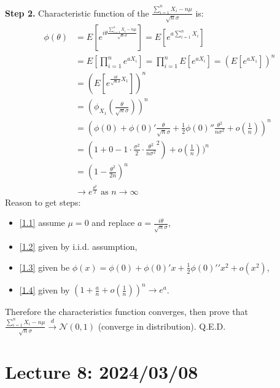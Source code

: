 \documentclass[11pt]{article}
\theoremstyle{definition}
\theoremstyle{remark}
\begin{document}
    \textbf{Step 2.} Characteristic function of the $\frac{\sum_{i=1}^{n} X_i -n\mu}{\sqrt{n}\sigma}$ is: 
    \begin{align}
        \phi(\theta) &= E[e^{i\theta \frac{\sum_{i=1}^{n} X_i -n\mu}{\sqrt{n}\sigma}}] = E[e^{a\sum_{i=1}^{n} X_i}] \label{1.1}\\
        &= E[\prod_{i=1}^n e^{aX_i}] = \prod_{i=1}^n E[ e^{aX_i}]  = (E[e^{a X_1}])^n\label{1.2}\\
        &=(E[e^{\frac{i\theta}{\sqrt{n}\sigma} X_1}])^n \\
        &= (\phi_{X_1}(\frac{\theta}{\sqrt{n}\sigma}))^n \\
        &= (\phi(0) + \phi(0)' \frac{\theta}{\sqrt{n}\sigma} + \frac{1}{2} \phi(0)'' \frac{\theta^2}{n\sigma^2} + o(\frac{1}{n}))^n \label{1.3} \\
        &= (1 + 0 - 1\cdot \frac{\sigma^2}{2}\cdot\frac{\theta^2}{n\sigma^2}^2) + o(\frac{1}{n}))^n \\
        &=(1 - \frac{\theta^2}{2n})^n  \label{1.4}\\
        & \rightarrow e^{\frac{\theta^2}{2}} \text{ as } n \rightarrow \infty
    \end{align}
    Reason to get steps:
    \begin{itemize}
        \item \eqref{1.1} assume $\mu = 0$ and replace $a = \frac{i\theta}{\sqrt{n}\sigma}$,
        \item \eqref{1.2} given by i.i.d. assumption,
        \item \eqref{1.3} given be $\phi(x) = \phi(0) + \phi(0)' x + \frac{1}{2} \phi(0)\prime \prime x^2 + o(x^2)$,
        \item \eqref{1.4} given by $(1 + \frac{a}{n}+o(\frac{1}{n}))^n \rightarrow e^a$.
    \end{itemize}
    Therefore the characteristics function converges, then prove that $\frac{\sum_{i=1}^{n} X_i -n\mu}{\sqrt{n}\sigma}\xrightarrow{d} \mathcal{N}(0,1)$ (converge in distribution). Q.E.D.

\section{Lecture 8: 2024/03/08}
\end{document}
